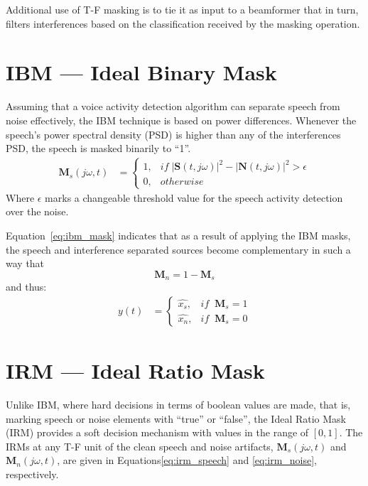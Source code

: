 Additional use of T-F masking 
is to tie it as input to a beamformer that
in turn, filters interferences based 
on the classification received 
by the masking operation.

\section{IBM --- Ideal Binary Mask}
Assuming that a voice activity detection algorithm
can separate speech from noise effectively,
the IBM technique is based on power differences.
Whenever the speech's power 
spectral density (PSD) is higher 
than any of the interferences PSD, 
the speech is masked binarily to ``1''.
\begin{align}\label{eq:ibm_mask}
    \mathbf{M}_{s}(j\omega, t) & = 
        \begin{cases}
            1, & if\;|\mathbf{S}(t,j\omega)|^2 - |\mathbf{N}(t,j\omega)|^2 > \epsilon \\
            0, & otherwise
        \end{cases}
\end{align}
Where \(\epsilon\) marks a changeable threshold value 
for the speech activity detection over the noise.

Equation~\ref{eq:ibm_mask} indicates that as a result of 
applying the IBM masks, the speech and interference separated
sources become complementary in such a way that
\[\mathbf{M}_{n} = 1 - \mathbf{M}_{s} \] and thus:
\begin{align}
    y(t) &= \begin{cases}
        \hat{x_{s}}, &if\;\;\mathbf{M}_{s} = 1 \\
        \hat{x_{n}}, &if\;\;\mathbf{M}_{s} = 0
    \end{cases}
\end{align}

\section{IRM --- Ideal Ratio Mask}
Unlike IBM, where hard decisions in terms of 
boolean values are made,
that is, marking speech or noise 
elements with ``true'' or ``false'', the Ideal Ratio Mask (IRM) provides a soft decision
mechanism with values in the range of \([0,1]\)\cite{Jiang2018RobustBF}.
The IRMs at any T-F unit of the clean speech and noise artifacts,
\(\mathbf{M}_{s}(j\omega, t)\) and \(\mathbf{M}_{n}(j\omega, t)\),
are given in 
Equations\;\ref{eq:irm_speech} and \ref{eq:irm_noise}, respectively.

